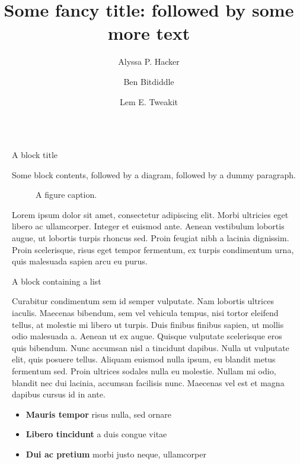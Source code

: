 \documentclass[final]{beamer}
\title{Some fancy title: followed by some more text}
\author{Alyssa P. Hacker \inst{1} \and Ben Bitdiddle \inst{2} \and Lem E. Tweakit \inst{2}}
\institute[shortinst]{\inst{1} Some Institute \samelineand \inst{2} Another Institute}
\newlength{\sepwidth}
\newlength{\colwidth}
\newcommand{\separatorcolumn}{\begin{column}{\sepwidth}\end{column}}
\begin{document}
\ifVerticalPoster

\begin{frame}[t]

  \begin{columns}[t]
  \separatorcolumn
  \begin{column}{\colwidth}

  \begin{block}{A block title}

    Some block contents, followed by a diagram, followed by a dummy paragraph.

    \begin{figure}
      \centering
      \caption{A figure caption.}
    \end{figure}

    Lorem ipsum dolor sit amet, consectetur adipiscing elit. Morbi ultricies
    eget libero ac ullamcorper. Integer et euismod ante. Aenean vestibulum
    lobortis augue, ut lobortis turpis rhoncus sed. Proin feugiat nibh a
    lacinia dignissim. Proin scelerisque, risus eget tempor fermentum, ex
    turpis condimentum urna, quis malesuada sapien arcu eu purus.

  \end{block}

  \begin{block}{A block containing a list}

    Curabitur condimentum sem id semper vulputate. Nam lobortis ultrices
    iaculis. Maecenas bibendum, sem vel vehicula tempus, nisi tortor eleifend
    tellus, at molestie mi libero ut turpis. Duis finibus finibus sapien, ut
    mollis odio malesuada a. Aenean ut ex augue. Quisque vulputate scelerisque
    eros quis bibendum. Nunc accumsan nisl a tincidunt dapibus. Nulla ut
    vulputate elit, quis posuere tellus. Aliquam euismod nulla ipsum, eu
    blandit metus fermentum sed. Proin ultrices sodales nulla eu molestie.
    Nullam mi odio, blandit nec dui lacinia, accumsan facilisis nunc. Maecenas
    vel est et magna dapibus cursus id in ante.

    \begin{itemize}
      \item \textbf{Mauris tempor} risus nulla, sed ornare
      \item \textbf{Libero tincidunt} a duis congue vitae
      \item \textbf{Dui ac pretium} morbi justo neque, ullamcorper
    \end{itemize}


\end{block}
\end{column}
\end{columns}
\end{frame}
\end{document}
